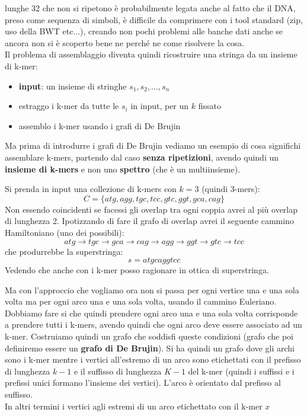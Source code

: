 \documentclass[a4paper,12pt, oneside]{book}
\begin{document}
lunghe 32 che non si ripetono è probabilmente legata anche al fatto che il DNA,
preso come sequenza di simboli, è difficile da comprimere con i tool standard
(zip, uso della BWT etc$\ldots$), creando non pochi problemi alle banche dati
anche se ancora non si è scoperto bene ne perché ne come risolvere la cosa.\\  
Il problema di assemblaggio diventa quindi ricostruire una stringa da un insieme
di k-mer:
\begin{itemize}
  \item \textbf{input}: un insieme di stringhe $s_1,s_2,\ldots,s_n$
  \item estraggo i k-mer da tutte le $s_i$ in input, per un $k$ fissato
  \item assemblo i k-mer usando i grafi di De Brujin
\end{itemize}
Ma prima di introdurre i grafi di De Brujin vediamo un esempio di cosa
significhi assemblare k-mers, partendo dal caso \textbf{senza ripetizioni},
avendo quindi un \textbf{insieme di k-mers} e non uno \textbf{spettro} (che è un
multiinsieme).
\begin{esempio}
  Si prenda in input una collezione di k-mers con $k=3$ (quindi 3-mers):
  \[C=\{atg, agg, tgc,tcc, gtc, ggt, gca, cag\}\]
  Non essendo coincidenti se facessi gli overlap tra ogni coppia avrei al più
  overlap di lunghezza 2. Ipotizzando di fare il grafo di overlap avrei il
  seguente cammino Hamiltoniano (uno dei possibili):
  \[atg\to tgc\to gca\to cag\to agg\to ggt\to gtc\to tcc\]
  che produrrebbe la superstringa:
  \[s=atgcaggtcc\]
  Vedendo che anche con i k-mer posso ragionare in ottica di superstringa.
\end{esempio}
Ma con l'approccio che vogliamo ora non si passa per ogni vertice una e una
sola volta ma per ogni arco una e una sola volta, usando il cammino
Euleriano.\\
Dobbiamo fare si che quindi prendere ogni arco una e una sola volta
corrisponde a prendere tutti i k-mers, avendo quindi che ogni arco deve essere
associato ad un k-mer. Costruiamo quindi un grafo che soddisfi queste
condizioni (grafo che poi definiremo essere un \textbf{grafo di De
  Brujin}). Si ha quindi un grafo dove gli archi sono i k-mer mentre i vertici
all'estremo di un arco sono etichettati con il prefisso di lunghezza $k-1$ e
il suffisso di lunghezza $K-1$ del
k-mer (quindi i suffissi e i prefissi unici formano l'insieme dei
vertici). L'arco è orientato dal prefisso al suffisso. \\
In altri termini i vertici agli estremi di un arco etichettato con il k-mer $x$
\end{document}
